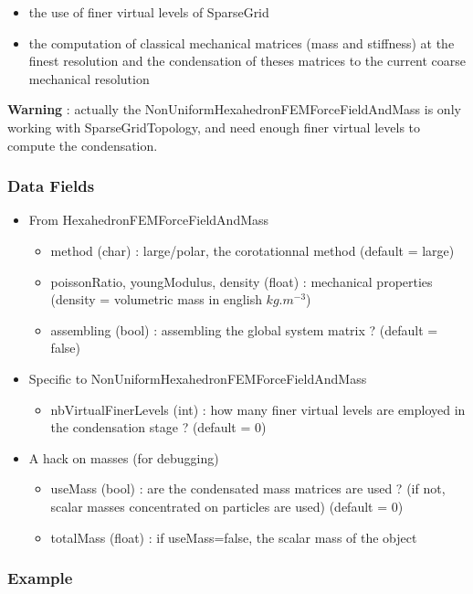 \begin{itemize}
\item the use of finer virtual levels of SparseGrid
\item the computation of classical mechanical matrices (mass and stiffness) at the finest resolution and the condensation of theses matrices to the current coarse mechanical resolution
\end{itemize}


\textbf{Warning} : actually the NonUniformHexahedronFEMForceFieldAndMass is only working with SparseGridTopology, and need enough finer virtual levels to compute the condensation. 

\subsubsection{Data Fields}

\begin{itemize}
\item From HexahedronFEMForceFieldAndMass
	\begin{itemize}
	\item method (char) : large/polar, the corotationnal method (default = large)
	\item poissonRatio, youngModulus, density (float) : mechanical properties (density = volumetric mass in english $kg.m^{-3}$)
	\item assembling (bool) : assembling the global system matrix ? (default = false)
	\end{itemize}
\item Specific to NonUniformHexahedronFEMForceFieldAndMass
	\begin{itemize}
	\item nbVirtualFinerLevels (int) : how many finer virtual levels are employed in the condensation stage ? (default = 0)
	\end{itemize}
\item A hack on masses (for debugging)
		\begin{itemize}
	\item useMass (bool) : are the condensated mass matrices are used ? (if not, scalar masses concentrated on particles are used) (default = 0)
	\item totalMass (float) : if useMass=false, the scalar mass of the object
	\end{itemize}
\end{itemize}


\subsubsection{Example}




